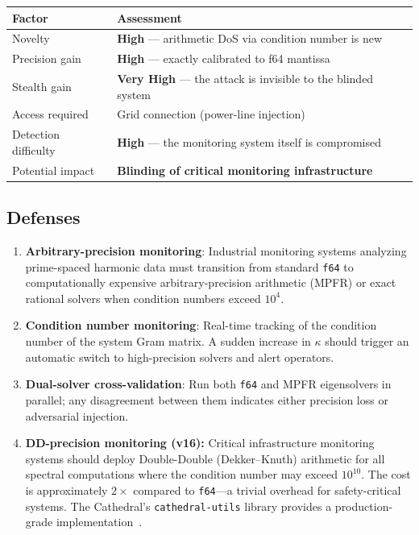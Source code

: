 \documentclass[11pt,a4paper]{article}
\begin{document}
\begin{center}
\begin{tabular}{@{}ll@{}}
\toprule
\textbf{Factor} & \textbf{Assessment} \\
\midrule
Novelty & \textbf{High} --- arithmetic DoS via condition number is new \\
Precision gain & \textbf{High} --- exactly calibrated to f64 mantissa \\
Stealth gain & \textbf{Very High} --- the attack is invisible to the blinded system \\
Access required & Grid connection (power-line injection) \\
Detection difficulty & \textbf{High} --- the monitoring system itself is compromised \\
Potential impact & \textbf{Blinding of critical monitoring infrastructure} \\
\bottomrule
\end{tabular}
\end{center}

\subsection{Defenses}

\begin{enumerate}
  \item \textbf{Arbitrary-precision monitoring}: Industrial monitoring
    systems analyzing prime-spaced harmonic data must transition from
    standard \texttt{f64} to computationally expensive arbitrary-precision
    arithmetic (MPFR) or exact rational solvers when condition numbers
    exceed $10^4$.
  \item \textbf{Condition number monitoring}: Real-time tracking of
    the condition number of the system Gram matrix. A sudden increase
    in $\kappa$ should trigger an automatic switch to high-precision
    solvers and alert operators.
  \item \textbf{Dual-solver cross-validation}: Run both \texttt{f64}
    and MPFR eigensolvers in parallel; any disagreement between them
    indicates either precision loss or adversarial injection.
  \item \textbf{DD-precision monitoring (v16):} Critical infrastructure
    monitoring systems should deploy Double-Double (Dekker--Knuth)
    arithmetic for all spectral computations where the condition number
    may exceed $10^{10}$. The cost is approximately $2\times$ compared
    to \texttt{f64}---a trivial overhead for safety-critical systems.
    The Cathedral's \texttt{cathedral-utils} library provides a
    production-grade implementation~\cite{dekker1971}.
\end{enumerate}
\end{document}
